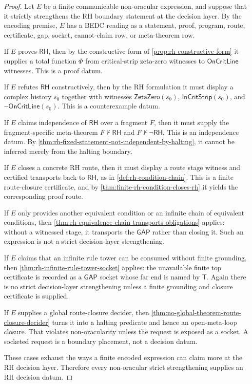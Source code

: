 \begin{proof}
Let $E$ be a finite communicable non-oracular expression, and suppose that
it strictly strengthens the RH boundary statement at the decision layer.
By the encoding premise, $E$ has a BEDC reading as a statement, proof,
program, route, certificate, gap, socket, cannot-claim row, or meta-theorem
row.

If $E$ proves $\mathsf{RH}$, then by the constructive form of
\autoref{prop:rh-constructive-form} it supplies a total function $\Phi$
from critical-strip zeta-zero witnesses to $\mathsf{OnCritLine}$ witnesses.
This is a proof datum.

If $E$ refutes $\mathsf{RH}$ constructively, then by the RH formulation it
must display a complex history $s_0$ together with witnesses
$\mathsf{ZetaZero}(s_0)$, $\mathsf{InCritStrip}(s_0)$, and
$\neg\mathsf{OnCritLine}(s_0)$.  This is a counterexample datum.

If $E$ claims independence of $\mathsf{RH}$ over a fragment $F$, then it
must supply the fragment-specific meta-theorem
$F\not\vdash\mathsf{RH}$ and $F\not\vdash\neg\mathsf{RH}$.  This is an
independence datum.  By
\autoref{thm:rh-fixed-statement-not-independent-by-halting}, it cannot be
inferred merely from the halting boundary.

If $E$ closes a concrete RH route, then it must display a route stage
witness and certified transports back to $\mathsf{RH}$, as in
\autoref{def:rh-condition-chain}.  This is a finite route-closure
certificate, and by \autoref{thm:finite-rh-condition-closes-rh} it yields
the corresponding proof route.

If $E$ only provides another equivalent condition or an infinite chain of
equivalent conditions, then
\autoref{thm:rh-equivalence-chain-transports-obligations} applies: without
a witnessed stage, it transports the $\mathsf{GAP}$ rather than closing
it.  Such an expression is not a strict decision-layer strengthening.

If $E$ claims that an infinite rule tower can be consumed without finite
grounding, then \autoref{thm:rh-infinite-rule-tower-socket} applies: the
unavailable finite top certificate is recorded as a $\mathsf{GAP}$ socket
whose far end is named by $\mathsf{T}$.  Again there is no strict
decision-layer strengthening unless a finite grounding and closure
certificate is supplied.

If $E$ supplies a global route-closure decider, then
\autoref{thm:no-global-theorem-route-closure-decider} turns it into a
halting predicate and hence an open-meta-loop closure.  That violates
non-oracularity unless the request is exposed as a socket.  A socketed
request is a boundary placement, not a decision datum.

These cases exhaust the ways a finite encoded expression can claim more at
the RH decision layer.  Therefore every non-oracular strict strengthening
supplies an RH decision datum.
\end{proof}

